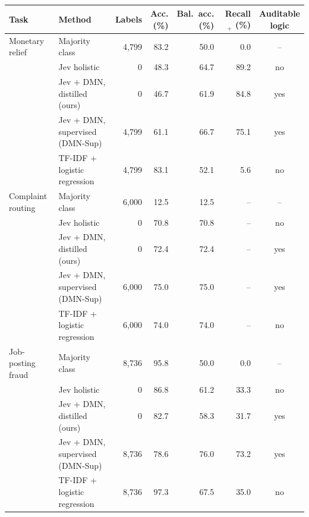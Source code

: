 \begin{tabular}{@{}llrrrrc@{}}
\toprule
Task & Method & Labels & \makecell[rb]{Acc.\\(\%)} & \makecell[rb]{Bal.\ acc.\\(\%)} & \makecell[rb]{Recall$_+$\\(\%)} & \makecell[cb]{Auditable\\logic} \\
\midrule
Monetary relief & Majority class & 4,799 & 83.2 & 50.0 & 0.0 & -- \\
 & Jev holistic & 0 & 48.3 & 64.7 & 89.2 & no \\
 & Jev + DMN, distilled (ours) & 0 & 46.7 & 61.9 & 84.8 & yes \\
 & Jev + DMN, supervised (DMN-Sup) & 4,799 & 61.1 & 66.7 & 75.1 & yes \\
 & TF-IDF + logistic regression & 4,799 & 83.1 & 52.1 & 5.6 & no \\
\midrule
Complaint routing & Majority class & 6,000 & 12.5 & 12.5 & -- & -- \\
 & Jev holistic & 0 & 70.8 & 70.8 & -- & no \\
 & Jev + DMN, distilled (ours) & 0 & 72.4 & 72.4 & -- & yes \\
 & Jev + DMN, supervised (DMN-Sup) & 6,000 & 75.0 & 75.0 & -- & yes \\
 & TF-IDF + logistic regression & 6,000 & 74.0 & 74.0 & -- & no \\
\midrule
Job-posting fraud & Majority class & 8,736 & 95.8 & 50.0 & 0.0 & -- \\
 & Jev holistic & 0 & 86.8 & 61.2 & 33.3 & no \\
 & Jev + DMN, distilled (ours) & 0 & 82.7 & 58.3 & 31.7 & yes \\
 & Jev + DMN, supervised (DMN-Sup) & 8,736 & 78.6 & 76.0 & 73.2 & yes \\
 & TF-IDF + logistic regression & 8,736 & 97.3 & 67.5 & 35.0 & no \\
\bottomrule
\end{tabular}
